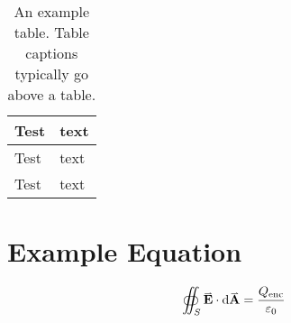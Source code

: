 \documentclass[a4paper, 12pt, english, conference]{IEEEtran}
\begin{document}
            \begin{table}[!h]
                \centering
                \caption{An example table. Table captions typically go above a table.}
                \label{table: example}
                \begin{tabular}{ |C{0.2\textwidth}|m{0.2\textwidth}| }
                    \hline
                    Test & text\\
                    \hline
                    \hline
                    Test & text\\
                    \hline
                    Test & text\\
                    \hline
                \end{tabular}
            \end{table}

        \section{Example Equation}
            \label{app: example equation}

            \begin{equation}
                \oiint_S \vect{E} \cdot \dd{\vect{A}} = \frac{Q_{\text{enc}}}{\varepsilon_0}
                \label{eq: Gauss Law}
            \end{equation}
\end{document}
